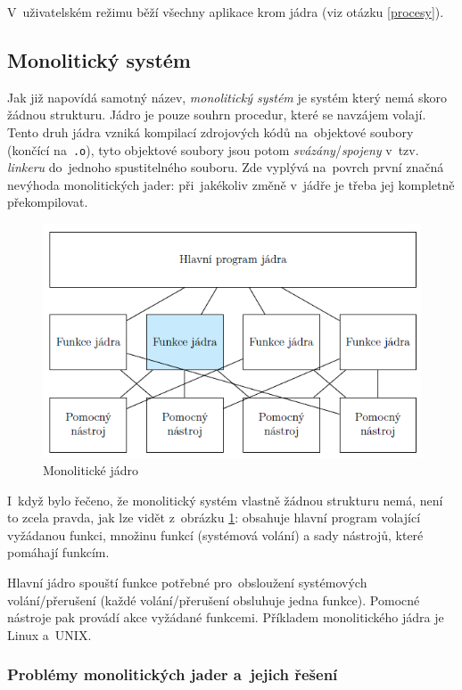V~uživatelském režimu běží všechny aplikace krom jádra (viz otázku \ref{procesy}).

\subsection{Monolitický systém}

Jak již napovídá samotný název, \emph{monolitický systém} je systém který nemá skoro žádnou strukturu. Jádro je pouze souhrn procedur, které se navzájem volají. Tento druh jádra vzniká kompilací zdrojových kódů na~objektové soubory (končící na~\texttt{.o}), tyto objektové soubory jsou potom \emph{svázány}/\emph{spojeny} v~tzv. \emph{linkeru} do~jednoho spustitelného souboru. Zde vyplývá na~povrch první značná nevýhoda monolitických jader: při~jakékoliv změně v~jádře je třeba jej kompletně překompilovat.

\begin{figure}[ht]
	\centering
	\includegraphics[scale=1]{images/OS_mono_kernel.png}
	\caption{Monolitické jádro}
	\label{OS_mono_kernel}
\end{figure}

I~když bylo řečeno, že monolitický systém vlastně žádnou strukturu nemá, není to zcela pravda, jak lze vidět z~obrázku \ref{OS_mono_kernel}: obsahuje hlavní program volající vyžádanou funkci, množinu funkcí (systémová volání) a sady nástrojů, které pomáhají funkcím.

Hlavní jádro spouští funkce potřebné pro~obsloužení systémových volání/přerušení (každé volání/přerušení obsluhuje jedna funkce). Pomocné nástroje pak provádí akce vyžádané funkcemi. Příkladem monolitického jádra je Linux a~UNIX.

\subsubsection{Problémy monolitických jader a~jejich řešení}

